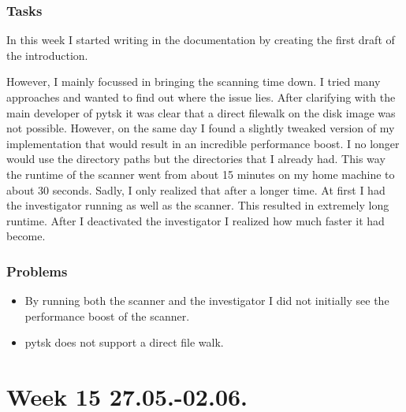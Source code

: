 \subsubsection{Tasks}

In this week I started writing in the documentation by creating the first draft of the introduction. 

However, I mainly focussed in bringing the scanning time down. I tried many approaches and wanted to find out where the issue lies. After clarifying with the main developer of \gls{pytsk} it was clear that a direct filewalk on the disk image was not possible. However, on the same day I found a slightly tweaked version of my implementation that would result in an incredible performance boost. I no longer would use the directory paths but the directories that I already had. This way the runtime of the scanner went from about 15 minutes on my home machine to about 30 seconds. Sadly, I only realized that after a longer time. At first I had the investigator running as well as the scanner. This resulted in extremely long runtime. After I deactivated the investigator I realized how much faster it had become. 

\subsubsection{Problems}

\begin{itemize}
    \item By running both the scanner and the investigator I did not initially see the performance boost of the scanner.
    \item \gls{pytsk} does not support a direct file walk.
\end{itemize}

\section{Week 15 27.05.-02.06.}
\label{sec:journal:week15}

